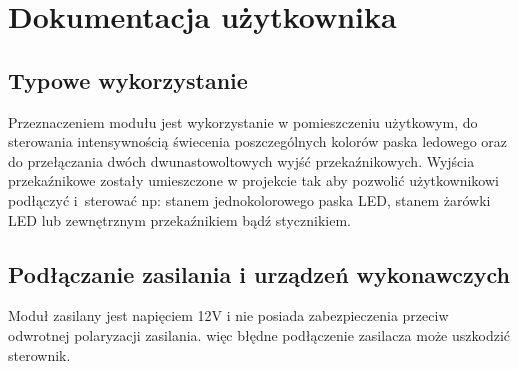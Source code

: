 \documentclass[12pt, eng, twoside, openany, final]{mgr}
\begin{document}
%
\chapter{Dokumentacja użytkownika}
\thispagestyle{fancy}
    \section{Typowe wykorzystanie}
    \indent
    Przeznaczeniem modułu jest wykorzystanie w pomieszczeniu użytkowym, do sterowania intensywnością świecenia poszczególnych kolorów paska ledowego oraz do przełączania dwóch dwunastowoltowych wyjść przekaźnikowych. Wyjścia przekaźnikowe zostały umieszczone w projekcie tak aby pozwolić użytkownikowi podłączyć i~sterować np: stanem jednokolorowego paska LED, stanem żarówki LED lub zewnętrznym przekaźnikiem bądź stycznikiem.
    
    \section{Podłączanie zasilania i urządzeń wykonawczych}
    Moduł zasilany jest napięciem 12V i nie posiada zabezpieczenia przeciw odwrotnej polaryzacji zasilania. więc błędne podłączenie zasilacza może uszkodzić sterownik. 
    
\end{document}
